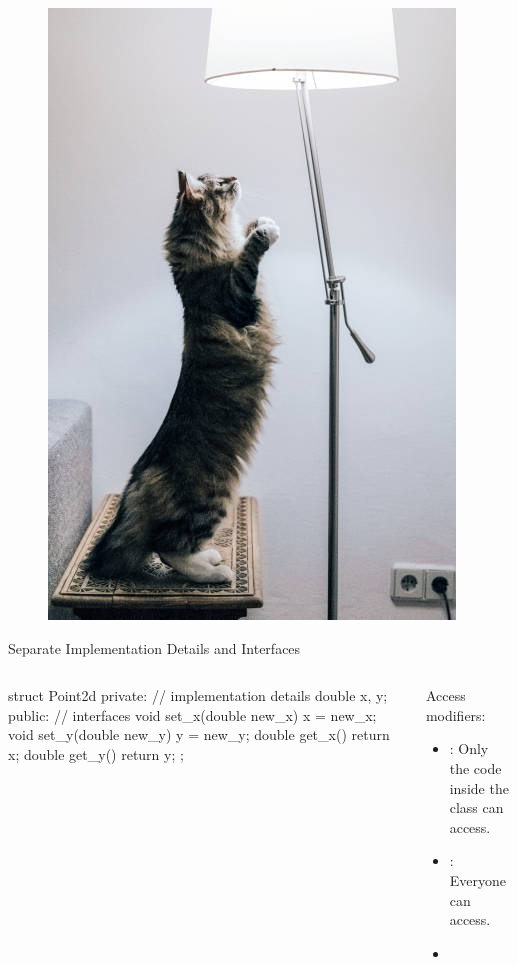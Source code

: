 \documentclass{beamer}
\begin{document}
\begin{frame}
    \begin{figure}[h]
        \centering
        \includegraphics[height=0.9\textheight]{figures/lamp.jpg}
    \end{figure}
\end{frame}

\begin{frame}[fragile]{Separate Implementation Details and Interfaces}
    \begin{columns}
        \begin{column}{0.5\linewidth}
            \begin{cpp}
struct Point2d {
 private:
  // implementation details
  double x, y;
 public:
  // interfaces
  void set_x(double new_x)
    { x = new_x; }
  void set_y(double new_y)
    { y = new_y; }
  double get_x()
    { return x; }
  double get_y()
    { return y; }
};
            \end{cpp}   
        \end{column}
        \begin{column}{0.5\linewidth}
            Access modifiers:
            \begin{itemize}
                \item {}: Only the code inside the class  can access.
                \item {}: Everyone can access.
                \item {}
            \end{itemize}
        \end{column}
    \end{columns}
\end{frame}
\end{document}
